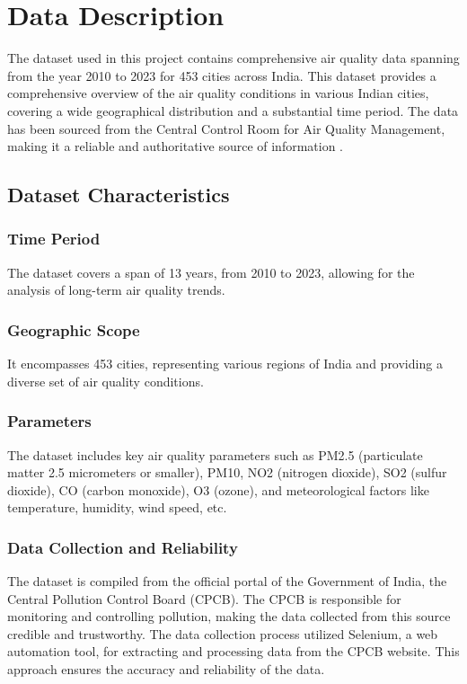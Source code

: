 %
%
%

\chapter{Data Description}


The dataset used in this project contains comprehensive air quality data spanning from the year 2010 to 2023 for 453 cities across India. This dataset provides a comprehensive overview of the air quality conditions in various Indian cities, covering a wide geographical distribution and a substantial time period. The data has been sourced from the Central Control Room for Air Quality Management, making it a reliable and authoritative source of information \cite{CPCB:2023}.

\section{Dataset Characteristics}

\subsection{Time Period}
The dataset covers a span of 13 years, from 2010 to 2023, allowing for the analysis of long-term air quality trends.

\subsection{Geographic Scope}
It encompasses 453 cities, representing various regions of India and providing a diverse set of air quality conditions.

\subsection{Parameters}
The dataset includes key air quality parameters such as PM2.5 (particulate matter 2.5 micrometers or smaller), PM10, NO2 (nitrogen dioxide), SO2 (sulfur dioxide), CO (carbon monoxide), O3 (ozone), and meteorological factors like temperature, humidity, wind speed, etc.

\subsection{Data Collection and Reliability}
The dataset is compiled from the official portal of the Government of India, the Central Pollution Control Board (CPCB). The CPCB is responsible for monitoring and controlling pollution, making the data collected from this source credible and trustworthy. The data collection process utilized Selenium, a web automation tool, for extracting and processing data from the CPCB website. This approach ensures the accuracy and reliability of the data\cite{CPCB:2023}.


